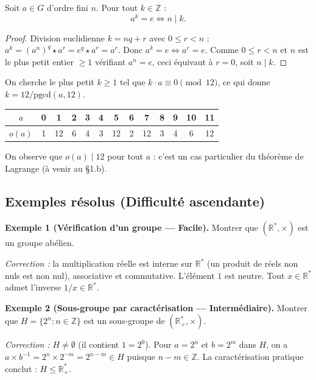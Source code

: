 \begin{proposition}
Soit $a \in G$ d'ordre fini $n$. Pour tout $k \in \mathbb{Z}$ :
\[ a^k = e \iff n \mid k. \]
\end{proposition}

\begin{proof}
Division euclidienne $k = nq + r$ avec $0 \le r < n$ : $a^k = (a^n)^q \star a^r = e^q \star a^r = a^r$. Donc $a^k = e \iff a^r = e$. Comme $0 \le r < n$ et $n$ est le plus petit entier $\ge 1$ vérifiant $a^n = e$, ceci équivaut à $r = 0$, soit $n \mid k$.
\end{proof}

\begin{exemple}
On cherche le plus petit $k \ge 1$ tel que $k \cdot a \equiv 0 \pmod{12}$, ce qui donne $k = 12 / \mathrm{pgcd}(a, 12)$.
\begin{center}
\begin{tabular}{c|cccccccccccc}
$a$ & 0 & 1 & 2 & 3 & 4 & 5 & 6 & 7 & 8 & 9 & 10 & 11 \\
\hline
$o(a)$ & 1 & 12 & 6 & 4 & 3 & 12 & 2 & 12 & 3 & 4 & 6 & 12 \\
\end{tabular}
\end{center}
On observe que $o(a) \mid 12$ pour tout $a$ : c'est un cas particulier du théorème de Lagrange (à venir au §1.b).
\end{exemple}

\subsection{Exemples résolus (Difficulté ascendante)}

\textbf{Exemple 1 (Vérification d'un groupe --- Facile).}
Montrer que $(\mathbb{R}^* , \times)$ est un groupe abélien.

\textit{Correction :} la multiplication réelle est interne sur $\mathbb{R}^*$ (un produit de réels non nuls est non nul), associative et commutative. L'élément $1$ est neutre. Tout $x \in \mathbb{R}^*$ admet l'inverse $1/x \in \mathbb{R}^*$.

\medskip

\textbf{Exemple 2 (Sous-groupe par caractérisation --- Intermédiaire).}
Montrer que $H = \{2^n : n \in \mathbb{Z}\}$ est un sous-groupe de $(\mathbb{R}^*_+, \times)$.

\textit{Correction :} $H \neq \emptyset$ (il contient $1 = 2^0$). Pour $a = 2^n$ et $b = 2^m$ dans $H$, on a $a \times b^{-1} = 2^n \times 2^{-m} = 2^{n-m} \in H$ puisque $n - m \in \mathbb{Z}$. La caractérisation pratique conclut : $H \le \mathbb{R}^*_+$.

